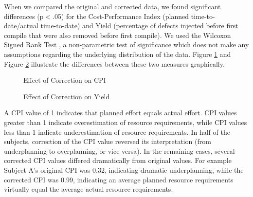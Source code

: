
When we compared the original and corrected data, we found significant
differences (p$<$.05) for the Cost-Performance Index (planned
time-to-date/actual time-to-date) and Yield (percentage of defects injected
before first compile that were also removed before first compile).  We used
the Wilcoxon Signed Rank Test \cite{Ferguson89}, a non-parametric test of
significance which does not make any assumptions regarding the underlying
distribution of the data.  Figure \ref{compareCPI} and Figure
\ref{compareYield} illustrate the differences between these two measures
graphically.  


  \begin{figure} [htbp]
    {\centerline{}}
    \caption{\label{compareCPI}Effect of Correction on CPI}
  \end{figure}

  \begin{figure} [htbp]
    {\centerline{}}
    \caption{\label{compareYield}Effect of Correction on Yield}
  \end{figure}


A CPI value of 1 indicates that planned effort equals actual effort. CPI
values greater than 1 indicate overestimation of resource requirements,
while CPI values less than 1 indicate underestimation of resource
requirements.  In half of the subjects, correction of the CPI value
reversed its interpretation (from underplanning to overplanning, or
vice-versa).  In the remaining cases, several corrected CPI values differed
dramatically from original values.  For example Subject A's original CPI
was 0.32, indicating dramatic underplanning, while the corrected CPI was
0.99, indicating an average planned resource requirements virtually equal
the average actual resource requirements.

